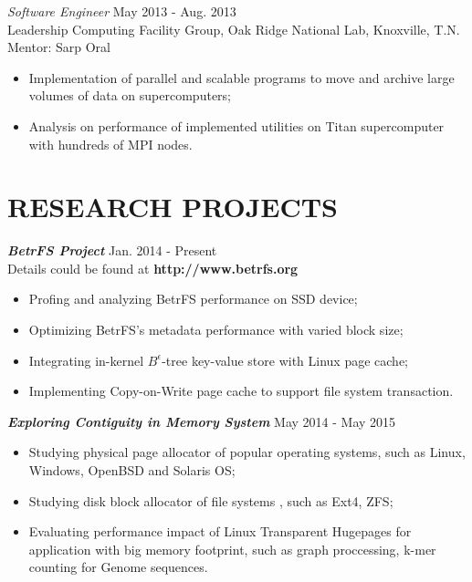 \documentclass[margin, 10pt]{res} %
\begin{document}
\begin{resume}
{\sl Software Engineer} \hfill May 2013 - Aug. 2013 \\
Leadership Computing Facility Group, Oak Ridge National Lab, Knoxville, T.N. \\
Mentor: Sarp Oral
\begin{itemize}
\item Implementation of parallel and scalable programs to move and archive large volumes of data on supercomputers;
\item Analysis on performance of implemented utilities on Titan supercomputer with hundreds of MPI nodes. 
\end{itemize}



\section{RESEARCH PROJECTS}

{\sl \textbf{BetrFS Project}} \hfill Jan. 2014 - Present \\
Details could be found at \textbf{http://www.betrfs.org}
\begin{itemize}
\item Profing and analyzing BetrFS performance on SSD device;
\item Optimizing BetrFS's metadata performance with varied block size;
\item Integrating in-kernel $B^{\epsilon}$-tree key-value store with Linux page cache;
\item Implementing Copy-on-Write page cache to support file system transaction.
\end{itemize} 

{\sl \textbf{Exploring Contiguity in Memory System}} \hfill May 2014 - May 2015  \\
\begin{itemize}
\item Studying physical page allocator of popular operating systems, such as Linux, Windows, OpenBSD and Solaris OS;
\item Studying disk block allocator of file systems , such as Ext4, ZFS;
\item Evaluating performance impact of Linux Transparent Hugepages for application with big memory footprint, such as graph proccessing, k-mer counting for Genome sequences.
\end{itemize} 



\end{resume}
\end{document}
